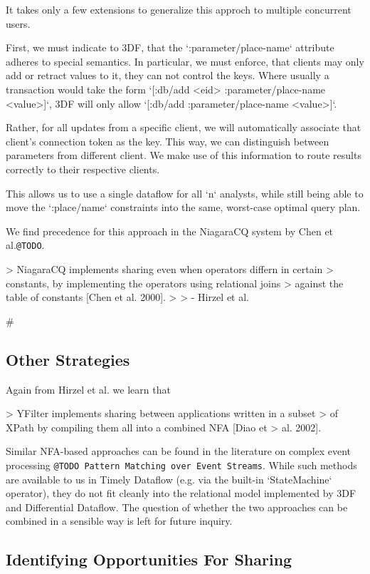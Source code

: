 \documentclass[../catalog.tex]{subfiles}
\begin{document}
It takes only a few extensions to generalize this approch to multiple
concurrent users.

First, we must indicate to 3DF, that the `:parameter/place-name`
attribute adheres to special semantics. In particular, we must
enforce, that clients may only add or retract values to it, they can
not control the keys. Where usually a transaction would take the form
`[:db/add <eid> :parameter/place-name <value>]`, 3DF will only allow
`[:db/add :parameter/place-name <value>]`.

Rather, for all updates from a specific client, we will automatically
associate that client's connection token as the key. This way, we can
distinguish between parameters from different client. We make use of
this information to route results correctly to their respective
clients.

This allows us to use a single dataflow for all `n` analysts, while
still being able to move the `:place/name` constraints into the same,
worst-case optimal query plan.

We find precedence for this approach in the NiagaraCQ system by Chen
et al.\texttt{@TODO}.

> NiagaraCQ implements sharing even when operators differn in certain
> constants, by implementing the operators using relational joins
> against the table of constants [Chen et al. 2000].
> 
> - Hirzel et al.

\#\subsection{Other Strategies}

Again from Hirzel et al. we learn that 

> YFilter implements sharing between applications written in a subset
> of XPath by compiling them all into a combined NFA [Diao et
> al. 2002].

Similar NFA-based approaches can be found in the literature on complex
event processing \texttt{@TODO Pattern Matching over Event Streams}. While
such methods are available to us in Timely Dataflow (e.g. via the
built-in `StateMachine` operator), they do not fit cleanly into the
relational model implemented by 3DF and Differential Dataflow. The
question of whether the two approaches can be combined in a sensible
way is left for future inquiry.

\subsection{Identifying Opportunities For Sharing}
\end{document}
